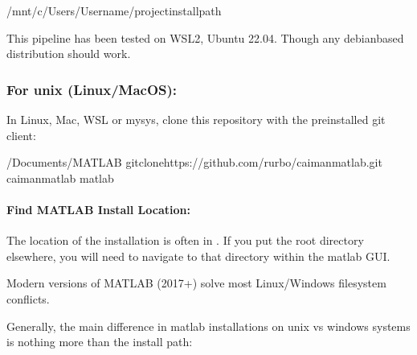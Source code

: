 \documentclass[letterpaper,10pt,english]{sphinxmanual}
\begin{document}
\begin{sphinxVerbatim}[commandchars=\\\{\}]
\PYGZdl{}/mnt/c/Users/\PYGZlt{}Username\PYGZgt{}/\PYGZlt{}project\PYGZhy{}install\PYGZhy{}path\PYGZgt{}
\end{sphinxVerbatim}

\sphinxAtStartPar
This pipeline has been tested on WSL2, Ubuntu 22.04. Though any debian\sphinxhyphen{}based distribution should work.


\subsubsection{For unix (Linux/MacOS):}
\label{\detokenize{get_started/install:for-unix-linux-macos}}
\sphinxAtStartPar
In Linux, Mac, WSL or mysys, clone this repository with the pre\sphinxhyphen{}installed git client:

\begin{sphinxVerbatim}[commandchars=\\\{\}]
\PYGZdl{}\PYGZti{}/Documents/MATLAB
\PYGZdl{}gitclonehttps://github.com/ru\PYGZhy{}rbo/caiman\PYGZus{}matlab.git
\PYGZdl{}caiman\PYGZus{}matlab
\PYGZdl{}matlab
\end{sphinxVerbatim}


\paragraph{Find MATLAB Install Location:}
\label{\detokenize{get_started/install:find-matlab-install-location}}
\sphinxAtStartPar
The location of the installation is often in .
If you put the root directory elsewhere, you will need to navigate to that directory within the matlab GUI.

\sphinxAtStartPar
Modern versions of MATLAB (2017+) solve most Linux/Windows filesystem conflicts.

\sphinxAtStartPar
Generally, the main difference in matlab installations on unix vs windows systems is nothing more than the install path:
\end{document}
